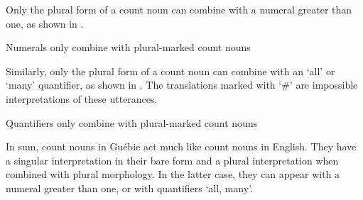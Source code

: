 \documentclass[output=paper,colorlinks,citecolor=brown]{langscibook}
\begin{document}
Only the plural form of a count noun can combine with a numeral greater than one, as shown in .

\ea%
    \label{ex:sande:4}
    Numerals only combine with plural-marked count nouns
    \z
\z

Similarly, only the plural form of a count noun can combine with an `all' or  `many' quantifier, as shown in . The translations marked with `\#' are impossible interpretations of these utterances.

\ea%
    \label{ex:sande:5}
    Quantifiers only combine with plural-marked count nouns
    \z
\z

In sum, count nouns in Guébie act much like count nouns in English. They have a singular interpretation in their bare form and a plural interpretation when combined with plural morphology. In the latter case, they can appear with a numeral greater than one, or with quantifiers `all, many'.
\end{document}
